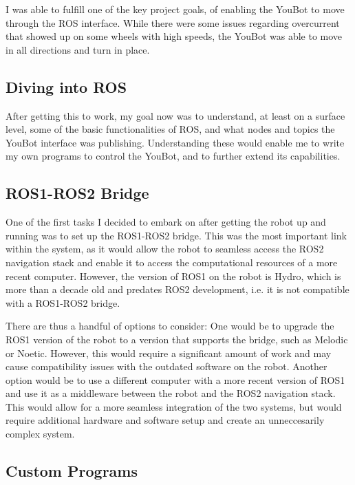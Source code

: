 \documentclass[a4paper, 12pt]{article}
\begin{document}
    I was able to fulfill one of the key project goals, of enabling the YouBot to move through the ROS interface. While there were some issues regarding overcurrent that showed up on some wheels with high speeds, the YouBot was able to move in all directions and turn in place. 

    \subsection{Diving into ROS}

    After getting this to work, my goal now was to understand, at least on a surface level, some of the basic functionalities of ROS, and what nodes and topics the YouBot interface was publishing. Understanding these would enable me to write my own programs to control the YouBot, and to further extend its capabilities. 

    

    

    \subsection{ROS1-ROS2 Bridge}

    One of the first tasks I decided to embark on after getting the robot up and running was to set up the ROS1-ROS2 bridge. This was the most important link within the system, as it would allow the robot to seamless access the ROS2 navigation stack and enable it to access the computational resources of a more recent computer. However, the version of ROS1 on the robot is Hydro, which is more than a decade old and predates ROS2 development, i.e. it is not compatible with a ROS1-ROS2 bridge. 
 
    There are thus a handful of options to consider: One would be to upgrade the ROS1 version of the robot to a version that supports the bridge, such as Melodic or Noetic. However, this would require a significant amount of work and may cause compatibility issues with the outdated software on the robot. Another option would be to use a different computer with a more recent version of ROS1 and use it as a middleware between the robot and the ROS2 navigation stack. This would allow for a more seamless integration of the two systems, but would require additional hardware and software setup and create an unneccesarily complex system. 

    \subsection{Custom Programs}
\end{document}
